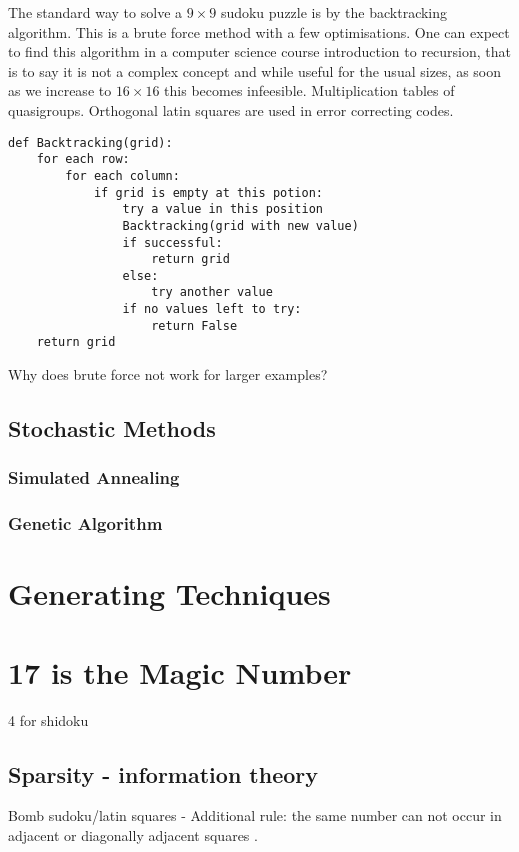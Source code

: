 \documentclass[a4paper,12pt]{article}
\begin{document}
		The standard way to solve a $9 \times 9$ sudoku puzzle is by the backtracking algorithm. 
		This is a brute force method with a few optimisations.
		One can expect to find this algorithm in a computer science course introduction to recursion, that is to say it is not a complex concept 
		and while useful for the usual sizes, as soon as we increase to $16 \times 16$ this becomes infeesible.
		Multiplication tables of quasigroups.
		Orthogonal latin squares are used in error correcting codes.
		
		\begin{lstlisting}[caption=Backtracking]
def Backtracking(grid):
    for each row:
        for each column:
            if grid is empty at this potion:
                try a value in this position
                Backtracking(grid with new value)
                if successful:
                    return grid
                else:
                    try another value
                if no values left to try:
                    return False
    return grid						
		\end{lstlisting}
		
		Why does brute force not work for larger examples?

	\subsection{Stochastic Methods}
		\subsubsection{Simulated Annealing}
		\subsubsection{Genetic Algorithm}
\section{Generating  Techniques}
	
\section{17 is the Magic Number}
	4 for shidoku
	\subsection{Sparsity - information theory}
		Bomb sudoku/latin squares - Additional rule: the same number can not occur in adjacent or diagonally adjacent squares .
\end{document}
